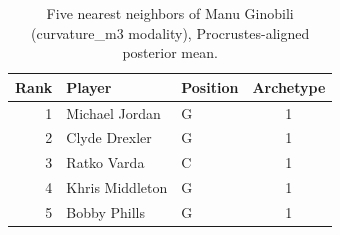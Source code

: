 \begin{table}[htbp]
  \centering\small
  \begin{tabular}{rllc}
    \toprule
    Rank & Player & Position & Archetype \\
    \midrule
    1 & Michael Jordan & G & 1 \\
    2 & Clyde Drexler & G & 1 \\
    3 & Ratko Varda & C & 1 \\
    4 & Khris Middleton & G & 1 \\
    5 & Bobby Phills & G & 1 \\
    \bottomrule
  \end{tabular}
  \caption{Five nearest neighbors of Manu Ginobili (curvature_m3 modality), Procrustes-aligned posterior mean.}
  \label{tab:Manu_Ginobili_neighbors_curvature_m3}
\end{table}

